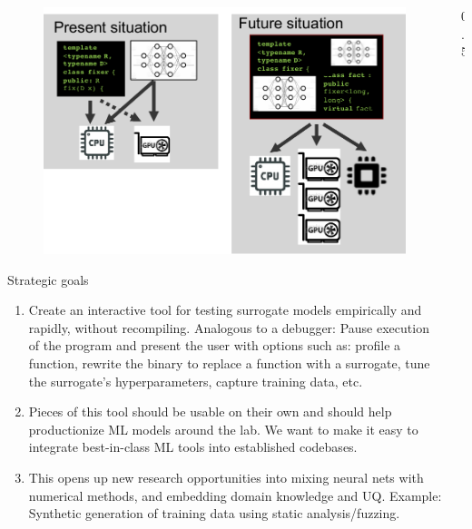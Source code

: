 \documentclass[final]{beamer}
\newlength{\sepwid}
\newlength{\onecolwid}
\begin{document}
\begin{frame}[fragile,t]
\begin{columns}[t]
\begin{column}{\onecolwid}
\begin{figure}
\includegraphics[width=0.6\linewidth]{cartoon2.pdf}
\end{figure}


\begin{block}{Strategic goals}
\begin{enumerate}
\item Create an interactive tool for testing surrogate models empirically and rapidly, without recompiling. Analogous to a debugger: Pause execution of the program and present the user with options such as: profile a function, rewrite the binary to replace a function with a surrogate, tune the surrogate’s hyperparameters, capture training data, etc.


\item Pieces of this tool should be usable on their own and should help productionize ML models around the lab. We want to make it easy to integrate best-in-class ML tools into established codebases. 


\item This opens up new research opportunities into mixing neural nets with numerical methods, and embedding domain knowledge and UQ. Example: Synthetic generation of training data using static analysis/fuzzing. 

\end{enumerate}
\end{block}





\end{column} %

\begin{column}{0.5\sepwid}\end{column} %


\end{columns}
\end{frame}
\end{document}
